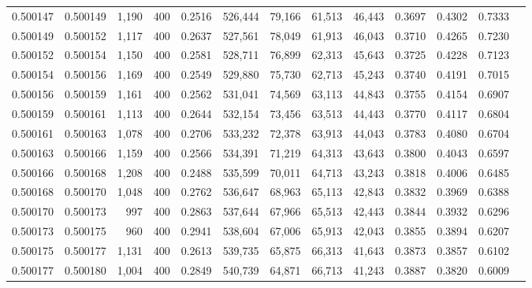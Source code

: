 \begin{tabular}{rrrrrrrrrrrrr}
0.500147 & 0.500149 &  1,190 & 400 &                                     0.2516 & 526,444 &  79,166 &  61,513 &  46,443 & 0.3697 & 0.4302 & 0.7333 \\
0.500149 & 0.500152 &  1,117 & 400 &                                     0.2637 & 527,561 &  78,049 &  61,913 &  46,043 & 0.3710 & 0.4265 & 0.7230 \\
0.500152 & 0.500154 &  1,150 & 400 &                                     0.2581 & 528,711 &  76,899 &  62,313 &  45,643 & 0.3725 & 0.4228 & 0.7123 \\
0.500154 & 0.500156 &  1,169 & 400 &                                     0.2549 & 529,880 &  75,730 &  62,713 &  45,243 & 0.3740 & 0.4191 & 0.7015 \\
0.500156 & 0.500159 &  1,161 & 400 &                                     0.2562 & 531,041 &  74,569 &  63,113 &  44,843 & 0.3755 & 0.4154 & 0.6907 \\
0.500159 & 0.500161 &  1,113 & 400 &                                     0.2644 & 532,154 &  73,456 &  63,513 &  44,443 & 0.3770 & 0.4117 & 0.6804 \\
0.500161 & 0.500163 &  1,078 & 400 &                                     0.2706 & 533,232 &  72,378 &  63,913 &  44,043 & 0.3783 & 0.4080 & 0.6704 \\
0.500163 & 0.500166 &  1,159 & 400 &                                     0.2566 & 534,391 &  71,219 &  64,313 &  43,643 & 0.3800 & 0.4043 & 0.6597 \\
0.500166 & 0.500168 &  1,208 & 400 &                                     0.2488 & 535,599 &  70,011 &  64,713 &  43,243 & 0.3818 & 0.4006 & 0.6485 \\
0.500168 & 0.500170 &  1,048 & 400 &                                     0.2762 & 536,647 &  68,963 &  65,113 &  42,843 & 0.3832 & 0.3969 & 0.6388 \\
0.500170 & 0.500173 &    997 & 400 &                                     0.2863 & 537,644 &  67,966 &  65,513 &  42,443 & 0.3844 & 0.3932 & 0.6296 \\
0.500173 & 0.500175 &    960 & 400 &                                     0.2941 & 538,604 &  67,006 &  65,913 &  42,043 & 0.3855 & 0.3894 & 0.6207 \\
0.500175 & 0.500177 &  1,131 & 400 &                                     0.2613 & 539,735 &  65,875 &  66,313 &  41,643 & 0.3873 & 0.3857 & 0.6102 \\
0.500177 & 0.500180 &  1,004 & 400 &                                     0.2849 & 540,739 &  64,871 &  66,713 &  41,243 & 0.3887 & 0.3820 & 0.6009 \\

\end{tabular}
